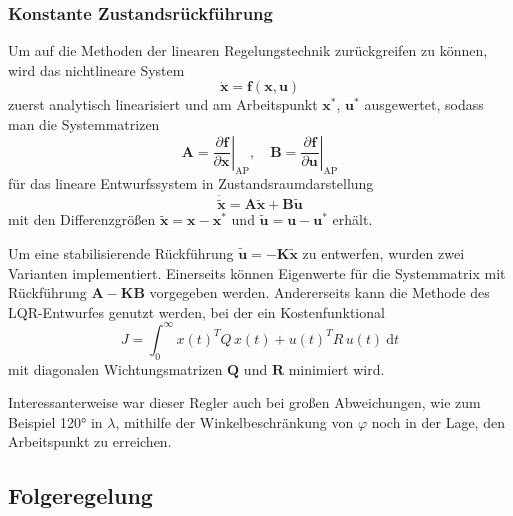 \documentclass[10pt,twocolumn]{article}
\newcommand{\partiell}[3][]{\frac{\partial^{#1}#2}{\partial{#3}^{#1}}}
\newcommand{\vect}[1]{\boldsymbol #1}
\begin{document}
	\subsubsection{Konstante Zustandsrückführung}
	\label{sect:state_feedback}
	Um auf die Methoden der linearen Regelungstechnik zurückgreifen zu können, wird das nichtlineare System
	\begin{equation}
	\dot{\vect x} = \vect f(\vect x, \vect u)
	\end{equation}
	zuerst analytisch linearisiert und am Arbeitspunkt \(\vect{x}^*\), \(\vect{u}^*\) ausgewertet, sodass man die Systemmatrizen
	\begin{equation}
	\vect{A} = \left. \partiell{\vect f}{\vect x}\right\vert_\mathrm{AP}, \quad
	\vect B = \left. \partiell{\vect f}{\vect u}\right\vert_\mathrm{AP}
	\end{equation}
	für das lineare Entwurfssystem in Zustandsraumdarstellung
	\begin{equation}
	\dot{\tilde{\vect{x}}} = \vect A \tilde{\vect{x}} + \vect B \tilde{\vect{u}}
	\end{equation}
	mit den Differenzgrößen
	\(
	\tilde{\vect{x}} = \vect{x} - \vect{x}^*
	\)
	und
	\(
	\tilde{\vect{u}} = \vect{u} - \vect{u}^*
	\)
	erhält.
	
	Um eine stabilisierende Rückführung \(\tilde{\vect{u}} = - \vect{K} \tilde{\vect{x}}\) zu entwerfen, wurden zwei Varianten implementiert.
	Einerseits können Eigenwerte für die Systemmatrix mit Rückführung \(\vect A - \vect K \vect B\) vorgegeben werden.
	Andererseits kann die Methode des LQR-Entwurfes genutzt werden, bei der ein Kostenfunktional
	\[
	J = \int^{\infty}_0 x(t)^T Q\, x(t) + u(t)^T R\, u(t)\ \mathrm dt
	\]
	mit diagonalen Wichtungsmatrizen \(\vect Q\) und \(\vect R\) minimiert wird.
	
	Interessanterweise war dieser Regler auch bei großen Abweichungen, wie zum Beispiel \ang{120} in \(\lambda\), mithilfe der Winkelbeschränkung von \(\varphi\) noch in der Lage, den Arbeitspunkt zu erreichen.
	\subsection{Folgeregelung}
\end{document}
